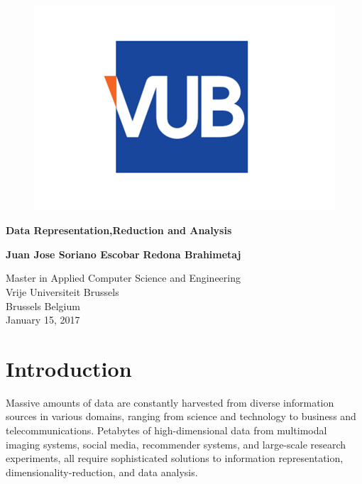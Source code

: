 \documentclass{article}
\begin{document}
    \begin{titlepage}
        \begin{center}
            \vspace*{1cm}
            \begin{figure}
                \centering
                \includegraphics[width=0.5\linewidth]{./img/vub.png}
            \end{figure}
            \Huge
            \textbf{Data Representation,Reduction and Analysis}
            
           
            
            \vspace{1.5cm}

            \textbf {\centering Juan Jose Soriano Escobar}
            \vspace{0.5cm}
            \newline
            \textbf{\centering Redona Brahimetaj}
            \vspace{0.5cm}
            \vfill
            
            
            \Large
            Master in Applied Computer Science and Engineering\\
            Vrije Universiteit Brussels\\
            Brussels Belgium\\
            January 15, 2017
            
        \end{center}
    \end{titlepage}

    \newpage

    \begin{appendix}
        \listoffigures
      \end{appendix}
      \newpage


        \section{Introduction}
        Massive amounts of data are constantly harvested from diverse information sources in various domains, ranging from science and technology to business and telecommunications. Petabytes of high-dimensional data from multimodal imaging systems, social media, recommender systems, and large-scale research experiments, all require sophisticated solutions to information representation, dimensionality-reduction, and data analysis. 
        
\end{document}
